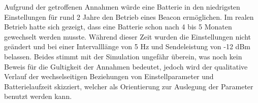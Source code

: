 Aufgrund der getroffenen Annahmen würde eine Batterie in den niedrigsten Einstellungen für rund 2 Jahre den Betrieb eines Beacon ermöglichen. Im realen Betrieb hatte sich gezeigt, dass eine Batterie schon nach 4 bis 5 Monaten gewechselt werden musste. Während dieser Zeit wurden die Einstellungen nicht geändert und bei einer Intervalllänge von 5 Hz und Sendeleistung von -12 dBm belassen. Beides stimmt mit der Simulation ungefähr überein, was noch kein Beweis für die Gultigkeit der Annahmen bedeutet, jedoch wird der qualitative Verlauf der wechselseitigen Beziehungen von Einstellparameter und Batterielaufzeit skizziert, welcher als Orientierung zur Auslegung der Parameter benutzt werden kann.